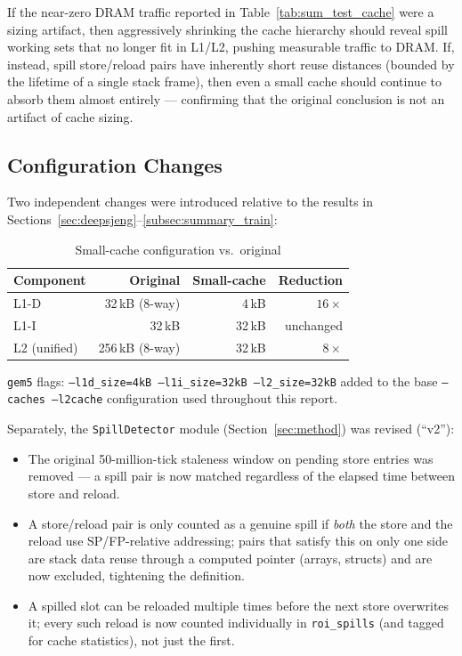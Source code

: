 \documentclass[11pt,a4paper]{article}
\begin{document}
If the near-zero DRAM traffic reported in Table~\ref{tab:sum_test_cache}
were a sizing artifact, then aggressively shrinking the cache hierarchy
should reveal spill working sets that no longer fit in L1/L2, pushing
measurable traffic to DRAM. If, instead, spill store/reload pairs have
inherently short reuse distances (bounded by the lifetime of a single
stack frame), then even a small cache should continue to absorb them
almost entirely --- confirming that the original conclusion is not an
artifact of cache sizing.

\subsection{Configuration Changes}

Two independent changes were introduced relative to the results in
Sections~\ref{sec:deepsjeng}--\ref{subsec:summary_train}:

\begin{table}[H]
\centering
\caption{Small-cache configuration vs.\ original}
\label{tab:smallcache_config}
\begin{tabular}{lrrr}
\toprule
\textbf{Component} & \textbf{Original} & \textbf{Small-cache} & \textbf{Reduction} \\
\midrule
L1-D & 32\,kB (8-way) & 4\,kB & $16\times$ \\
L1-I & 32\,kB & 32\,kB & unchanged \\
L2 (unified) & 256\,kB (8-way) & 32\,kB & $8\times$ \\
\bottomrule
\end{tabular}
\end{table}

\texttt{gem5} flags: \texttt{--l1d\_size=4kB --l1i\_size=32kB
--l2\_size=32kB} added to the base \texttt{--caches --l2cache}
configuration used throughout this report.

Separately, the \texttt{SpillDetector} module (Section~\ref{sec:method})
was revised (``v2''):
\begin{itemize}
  \item The original 50-million-tick staleness window on pending store
        entries was removed --- a spill pair is now matched regardless
        of the elapsed time between store and reload.
  \item A store/reload pair is only counted as a genuine spill if
        \emph{both} the store and the reload use SP/FP-relative
        addressing; pairs that satisfy this on only one side are stack
        data reuse through a computed pointer (arrays, structs) and are
        now excluded, tightening the definition.
  \item A spilled slot can be reloaded multiple times before the next
        store overwrites it; every such reload is now counted
        individually in \texttt{roi\_spills} (and tagged for cache
        statistics), not just the first.
\end{itemize}
\end{document}
